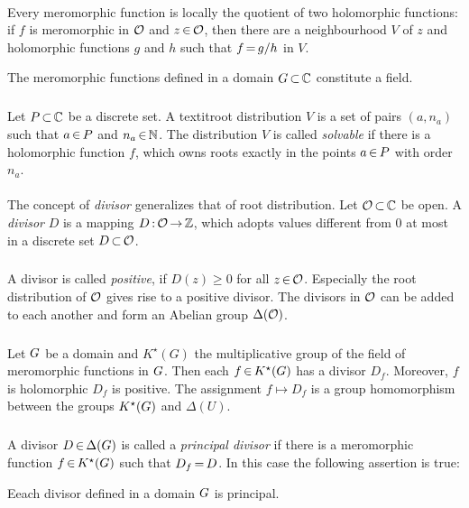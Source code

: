 \documentclass[11pt,twoside]{article}
\begin{document}
\paragraph{}
Every meromorphic function is locally the quotient of two holomorphic functions:
if $f$ is meromorphic in $\mathcal{O}$ and $z {\,\in\,} \mathcal{O}$,
then there are a neighbourhood $V$ of $z$ and holomorphic functions $g$ and $h$
such that
$f {\,=\,} g/h$ in $V$.

\begin{theorem}
The meromorphic functions defined in a domain $G {\,\subset\,} {\mathbb{C}}$ constitute a field.
\end{theorem}

\subparagraph{}
Let $P {\,\subset\,} {\mathbb{C}}$ be a discrete set.
A textit{root distribution} $V$ is a set of pairs $(a,n_a)$
such that
$a {\,\in\,} P$ and $n_a {\,\in\,} {\mathbb{N}}$.
The distribution $V$ is called \textit{solvable}
if there is a holomorphic function $f$,
which owns roots exactly in the points $a {\,\in\,} P$ with order $n_a$.

\paragraph{}
The concept of \textit{divisor} generalizes that of root distribution.
Let $\mathcal{O} {\,\subset\,} {\mathbb{C}}$ be open.
A \textit{divisor} $D$ is a mapping $D {\,:\,} \mathcal{O} {\,\to\,} {\mathbb{Z}}$,
which adopts values different from $0$
at most in a discrete set $D {\,\subset\,} \mathcal{O}$.

\subparagraph{}
A divisor is called \textit{positive},
if $D(z) \geq 0$ for all $z {\,\in\,} \mathcal{O}$.
Especially the root distribution of $\mathcal{O}$ gives rise to a positive divisor.
The divisors in $\mathcal{O}$ can be added to each another
and form an Abelian group $\Delta(\mathcal{O})$.

\subparagraph{}
Let $G$ be a domain and $K^{\star}(G)$ the multiplicative group
of the field of meromorphic functions in $G$.
Then each $f {\,\in\,} K^{\star}(G)$ has a divisor $D_f$.
Moreover,
$f$ is holomorphic \iff $D_f$ is positive.
The assignment $f \mapsto D_f$ is a group homomorphism 
between the groups $K^{\star}(G)$ and $\Delta(U)$.

\subparagraph{}
A divisor $D {\,\in\,} \Delta(G)$ is called a \textit{principal divisor}
if there is a meromorphic function $f {\,\in\,} K^{\star}(G)$
such that
$D_f {\,=\,} D$.
In this case the following assertion is true:

\begin{theorem}
Eeach divisor defined in a domain $G$ is principal.
\end{theorem}
\end{document}
